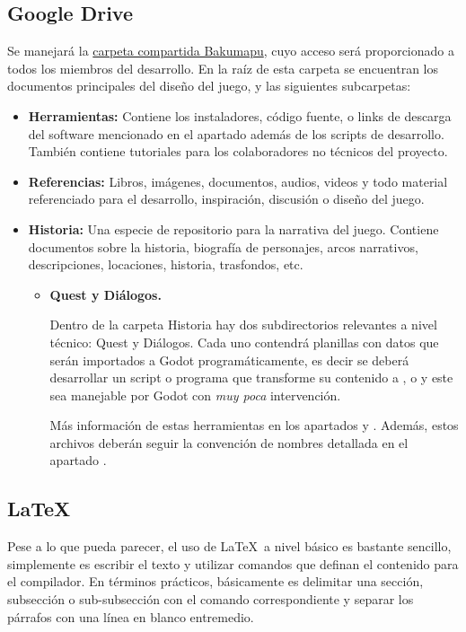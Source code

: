 \subsection{Google Drive}\label{flujo:google-drive}
Se manejará la \href{https://drive.google.com/open?id=1p8u-1UpXts8OHGRHEZLSIiQrqqx0Y4Kt}{carpeta compartida Bakumapu}, cuyo acceso será proporcionado a todos los miembros del desarrollo. En la raíz de esta carpeta se encuentran los documentos principales del diseño del juego, y las siguientes subcarpetas:
\begin{itemize}
	\item \textbf{Herramientas:} Contiene los instaladores, código fuente, o links de descarga del software mencionado en el apartado  además de los scripts de desarrollo. También contiene tutoriales para los colaboradores no técnicos del proyecto.
	\item \textbf{Referencias:} Libros, imágenes, documentos, audios, videos y todo material referenciado para el desarrollo, inspiración, discusión o diseño del juego.
	\item \textbf{Historia:} Una especie de repositorio para la narrativa del juego. Contiene documentos sobre la historia, biografía de personajes, arcos narrativos, descripciones, locaciones, historia, trasfondos, etc.
	\begin{itemize}
		\item \textbf{Quest y Diálogos.}
		
		Dentro de la carpeta Historia hay dos subdirectorios relevantes a nivel técnico: Quest y Diálogos. Cada uno contendrá planillas con datos que serán importados a Godot programáticamente, es decir se deberá desarrollar un script o programa que transforme su contenido a ,  o  y este sea manejable por Godot con \emph{muy poca} intervención.
		
		Más información de estas herramientas en los apartados  y . Además, estos archivos deberán seguir la convención de nombres detallada en el apartado .
	\end{itemize}
\end{itemize}


\subsection{LaTeX}\label{flujo:latex}
Pese a lo que pueda parecer, el uso de \LaTeX\ a nivel básico es bastante sencillo, simplemente es escribir el texto y utilizar comandos que definan el contenido para el compilador. En términos prácticos, básicamente es delimitar una sección, subsección o sub-subsección con el comando correspondiente y separar los párrafos con una línea en blanco entremedio.

